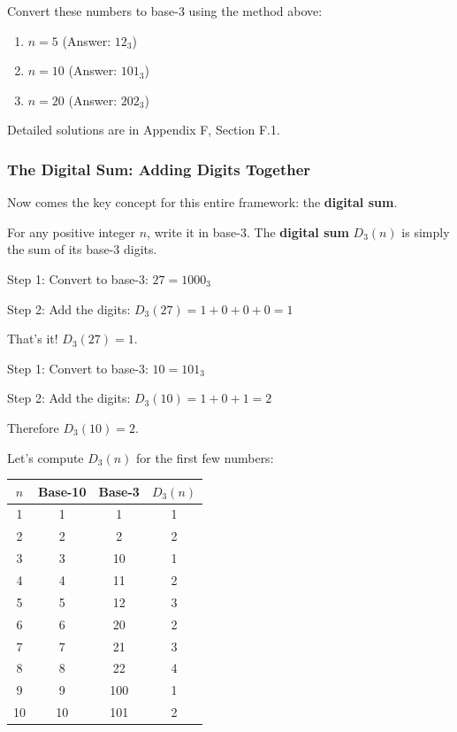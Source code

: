 \begin{tryit}
Convert these numbers to base-3 using the method above:
\begin{enumerate}
\item $n = 5$ (Answer: $12_3$)
\item $n = 10$ (Answer: $101_3$)
\item $n = 20$ (Answer: $202_3$)
\end{enumerate}

Detailed solutions are in Appendix F, Section F.1.
\end{tryit}

\subsubsection*{The Digital Sum: Adding Digits Together}

Now comes the key concept for this entire framework: the \textbf{digital sum}.

\begin{definition}
For any positive integer $n$, write it in base-3. The \textbf{digital sum} $D_3(n)$ is simply the sum of its base-3 digits.
\end{definition}

\begin{example}[Computing $D_3(27)$]
Step 1: Convert to base-3: $27 = 1000_3$

Step 2: Add the digits: $D_3(27) = 1 + 0 + 0 + 0 = 1$

That's it! $D_3(27) = 1$.
\end{example}

\begin{example}[Computing $D_3(10)$]
Step 1: Convert to base-3: $10 = 101_3$

Step 2: Add the digits: $D_3(10) = 1 + 0 + 1 = 2$

Therefore $D_3(10) = 2$.
\end{example}

Let's compute $D_3(n)$ for the first few numbers:

\begin{center}
\begin{tabular}{c|c|c|c}
$n$ & Base-10 & Base-3 & $D_3(n)$ \\
\hline
1 & 1 & 1 & 1 \\
2 & 2 & 2 & 2 \\
3 & 3 & 10 & 1 \\
4 & 4 & 11 & 2 \\
5 & 5 & 12 & 3 \\
6 & 6 & 20 & 2 \\
7 & 7 & 21 & 3 \\
8 & 8 & 22 & 4 \\
9 & 9 & 100 & 1 \\
10 & 10 & 101 & 2 \\
\end{tabular}
\end{center}

